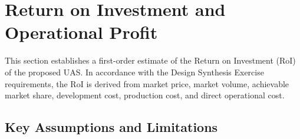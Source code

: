 \chapter{Return on Investment and Operational Profit}
\label{sec:roi}

\setlength{\parskip}{0.3em}
\setlength{\abovedisplayskip}{6pt}
\setlength{\belowdisplayskip}{6pt}
\setlength{\abovedisplayshortskip}{4pt}
\setlength{\belowdisplayshortskip}{4pt}
\setlength{\textfloatsep}{8pt}
\setlength{\floatsep}{8pt}
\setlength{\intextsep}{8pt}
\vspace{-10pt}
This section establishes a first-order estimate of the Return on Investment (RoI) of the proposed UAS. In accordance with the Design Synthesis Exercise requirements, the RoI is derived from market price, market volume, achievable market share, development cost, production cost, and direct operational cost.

\vspace{-10pt}
\section{Key Assumptions and Limitations}

